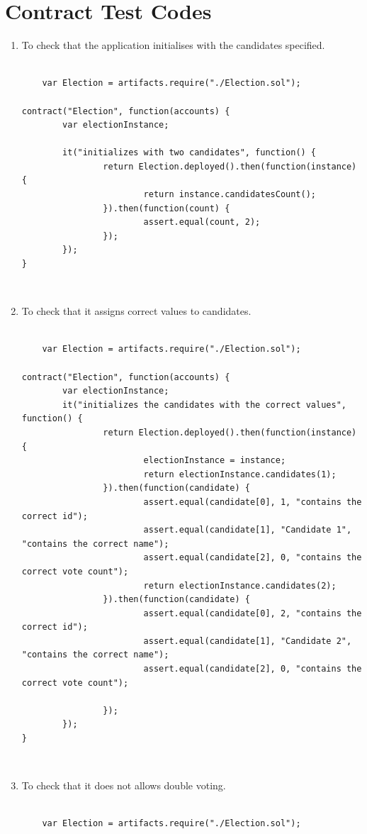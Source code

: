 \documentclass{article}
\begin{document}
\section{Contract Test Codes}
\begin{enumerate}
    \item To check that the application initialises with the candidates specified.\\
    \\
    \begin{verbatim}
    var Election = artifacts.require("./Election.sol");

contract("Election", function(accounts) {
        var electionInstance;

        it("initializes with two candidates", function() {
                return Election.deployed().then(function(instance) {
                        return instance.candidatesCount();
                }).then(function(count) {
                        assert.equal(count, 2);
                });
        });  
}
    \end{verbatim}
\\
    \item To check that it assigns correct values to candidates.\\
    \\
    \begin{verbatim}
    var Election = artifacts.require("./Election.sol");

contract("Election", function(accounts) {
        var electionInstance;
        it("initializes the candidates with the correct values", function() {
                return Election.deployed().then(function(instance) {
                        electionInstance = instance;
                        return electionInstance.candidates(1);
                }).then(function(candidate) {
                        assert.equal(candidate[0], 1, "contains the correct id");
                        assert.equal(candidate[1], "Candidate 1", "contains the correct name");
                        assert.equal(candidate[2], 0, "contains the correct vote count");
                        return electionInstance.candidates(2);
                }).then(function(candidate) {
                        assert.equal(candidate[0], 2, "contains the correct id");
                        assert.equal(candidate[1], "Candidate 2", "contains the correct name");
                        assert.equal(candidate[2], 0, "contains the correct vote count");

                });
        });
}        
    \end{verbatim}
\\
    \item To check that it does not allows double voting.\\
    \\
   \begin{verbatim}
    var Election = artifacts.require("./Election.sol");


\end{verbatim}
\end{enumerate}
\end{document}
